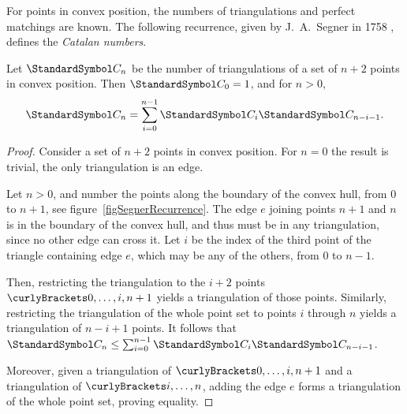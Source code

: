 For points in convex position, the numbers of triangulations and perfect matchings are known.
The following recurrence, given by J.~A.~Segner in 1758 \cite{Segner1758}, defines the \emph{Catalan numbers}.
\begin{theorem}[Segner]
Let $\CatalanNumber n$ be the number of triangulations of a set of $n+2$ points in convex position.
Then $\CatalanNumber 0 = 1$, and for $n>0$, \begin{equation}
\CatalanNumber n = \sum {i=0}[n-1] \CatalanNumber i \CatalanNumber {n-i-1}\text. \label{CatalanRecurrence}
\end{equation}
\begin{proof}
Consider a set of $n+2$ points in convex position.
For $n=0$ the result is trivial, the only triangulation is an edge.

Let $n > 0$, and number the points along the boundary of the convex hull, from $0$ to $n+1$,
see figure~\ref{figSegnerRecurrence}.
The edge $e$ joining points $n+1$ and $n$ is in the boundary of the convex hull, and thus must
be in any triangulation, since no other edge can cross it. Let $i$ be the index of the third point of the
triangle containing edge $e$, which may be any of the others, from $0$ to $n-1$.

Then, restricting the triangulation to the $i+2$ points $\set{0,\dotsc,i,n+1}$ yields a triangulation
of those points.
Similarly, restricting the triangulation of the whole point set to points $i$ through $n$ yields a triangulation of
$n-i+1$ points. It follows that $\CatalanNumber n \leq \sum {i=0}[n-1] \CatalanNumber i \CatalanNumber {n-i-1}$.

Moreover, given a triangulation of $\set{0,\dotsc,i,n+1}$ and a triangulation of $\set{i,\dotsc, n}$,
adding the edge $e$ forms a triangulation of the whole point set, proving equality.
\end{proof}
\end{theorem}
